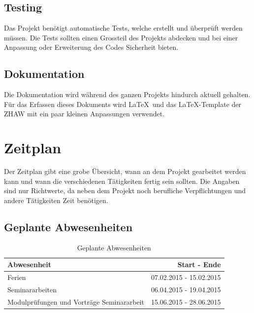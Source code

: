 \subsection{Testing}\label{testing}
Das Projekt benötigt automatische Tests, welche erstellt und überprüft werden müssen. Die Tests sollten einen Grossteil des Projekts abdecken und bei einer Anpassung oder Erweiterung des 
Codes Sicherheit bieten.

\subsection{Dokumentation}\label{dokumentation}
Die Dokumentation wird während des ganzen Projekts hindurch aktuell gehalten. Für das Erfassen dieses Dokuments wird \LaTeX\ und das \LaTeX-Template der ZHAW \cite{zhaw_latex_template} mit ein 
paar kleinen Anpassungen verwendet.

\section{Zeitplan}\label{zeitplan}
Der Zeitplan gibt eine grobe Übersicht, wann an dem Projekt gearbeitet werden kann und wann die verschiedenen Tätigkeiten fertig sein sollten. Die Angaben sind nur Richtwerte, da neben dem 
Projekt noch berufliche Verpflichtungen und andere Tätigkeiten Zeit benötigen.

\subsection{Geplante Abwesenheiten}
\begin{table}[ht]
\centering
  \begin{tabular}{ l | r }
	\hline
	\rowcolor{gray}
	\textbf{Abwesenheit}					&	\textbf{Start - Ende}	\\ \hline
	Ferien								&	07.02.2015 - 15.02.2015	\\ \hline
	Seminararbeiten						&	06.04.2015 - 19.04.2015	\\ \hline
	Modulprüfungen und Vorträge Seminararbeit		&	15.06.2015 - 28.06.2015	\\ \hline
  \end{tabular}
   \caption{Geplante Abwesenheiten}\label{table:holidays}
\end{table}

\newpage 

